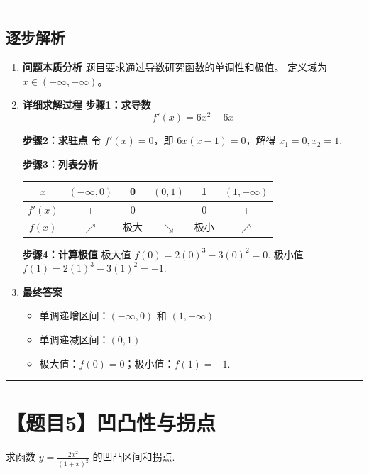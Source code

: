 \documentclass[12pt, a4paper]{article}
\newenvironment{redenv}{\color{red}}{}
\newenvironment{detailedanalysis}{%
    \color{red}
    \begin{enumerate}[label=\textbf{第\arabic*步：}, leftmargin=*, align=left, itemsep=1.5ex]
}{%
    \end{enumerate}
}
\newcommand{\problemrule}{\noindent\rule{\textwidth}{1.5pt}\vspace{-0.8em}}
\newcommand{\analysisrule}{\noindent\rule{\textwidth}{0.8pt}\vspace{-0.8em}}
\begin{document}
\begin{redenv}
\analysisrule
\subsection*{逐步解析}

\begin{detailedanalysis}
\item \textbf{问题本质分析}
题目要求通过导数研究函数的单调性和极值。
定义域为 $x \in (-\infty, +\infty)$。

\item \textbf{详细求解过程}
\textbf{步骤1：求导数}
\[ f'(x) = 6x^2 - 6x \]

\textbf{步骤2：求驻点}
令 $f'(x) = 0$，即 $6x(x-1) = 0$，解得 $x_1 = 0, x_2 = 1$.

\textbf{步骤3：列表分析}
\begin{center}
\begin{tabular}{|c|c|c|c|c|c|}
\hline
$x$ & $(-\infty, 0)$ & 0 & $(0, 1)$ & 1 & $(1, +\infty)$ \\
\hline
$f'(x)$ & + & 0 & - & 0 & + \\
\hline
$f(x)$ & $\nearrow$ & 极大 & $\searrow$ & 极小 & $\nearrow$ \\
\hline
\end{tabular}
\end{center}

\textbf{步骤4：计算极值}
极大值 $f(0) = 2(0)^3 - 3(0)^2 = 0$.
极小值 $f(1) = 2(1)^3 - 3(1)^2 = -1$.

\item \textbf{最终答案}
\begin{itemize}
    \item 单调递增区间：$(-\infty, 0)$ 和 $(1, +\infty)$
    \item 单调递减区间：$(0, 1)$
    \item 极大值：$f(0)=0$；极小值：$f(1)=-1$.
\end{itemize}
\end{detailedanalysis}
\end{redenv}


\problemrule
\section*{【题目5】凹凸性与拐点}
求函数 $y = \frac{2x^2}{(1+x)^2}$ 的凹凸区间和拐点.
\end{document}
